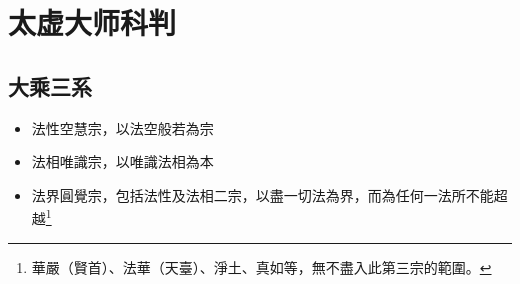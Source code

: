 \section{太虚大师科判}

\subsection{大乘三系}
\begin{itemize}
  \item 法性空慧宗，以法空般若為宗
  \item 法相唯識宗，以唯識法相為本
  \item 法界圓覺宗，包括法性及法相二宗，以盡一切法為界，而為任何一法所不能超越\footnote{華嚴（賢首）、法華（天臺）、淨土、真如等，無不盡入此第三宗的範圍。}
\end{itemize}
